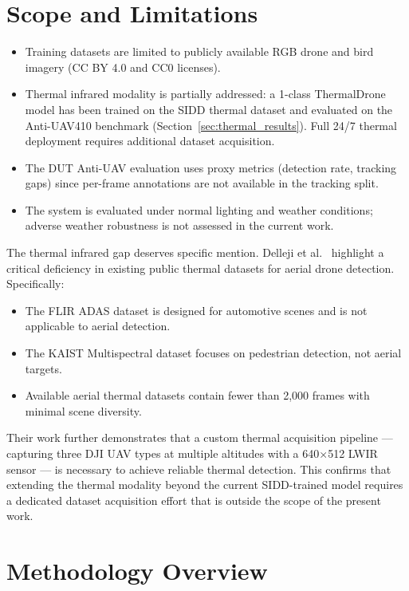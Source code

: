 \documentclass[12pt,a4paper]{report}
\begin{document}
\section{Scope and Limitations}

\begin{itemize}
  \item Training datasets are limited to publicly available RGB drone and
        bird imagery (CC BY 4.0 and CC0 licenses).
  \item Thermal infrared modality is partially addressed: a 1-class
        ThermalDrone model has been trained on the SIDD thermal dataset
        and evaluated on the Anti-UAV410 benchmark
        (Section~\ref{sec:thermal_results}). Full 24/7 thermal deployment
        requires additional dataset acquisition.
  \item The DUT Anti-UAV evaluation uses proxy metrics (detection rate,
        tracking gaps) since per-frame annotations are not available in
        the tracking split.
  \item The system is evaluated under normal lighting and weather conditions;
        adverse weather robustness is not assessed in the current work.
\end{itemize}

The thermal infrared gap deserves specific mention. Delleji et al.~\cite{delleji2025thermal}
highlight a critical deficiency in existing public thermal datasets for aerial drone detection.
Specifically:
\begin{itemize}
  \item The FLIR ADAS dataset is designed for automotive scenes and is not applicable to aerial detection.
  \item The KAIST Multispectral dataset focuses on pedestrian detection, not aerial targets.
  \item Available aerial thermal datasets contain fewer than 2,000 frames with minimal scene diversity.
\end{itemize}
Their work further demonstrates that a custom thermal acquisition pipeline --- capturing three
DJI UAV types at multiple altitudes with a 640$\times$512 LWIR sensor --- is necessary to
achieve reliable thermal detection. This confirms that extending the thermal modality beyond
the current SIDD-trained model requires a dedicated dataset acquisition effort that is outside
the scope of the present work.

\section{Methodology Overview}
\end{document}
